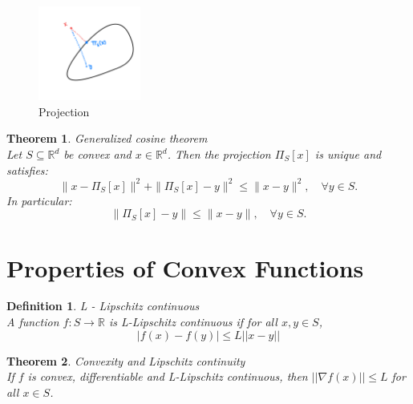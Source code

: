 \documentclass[11pt]{book} %
\newtheorem{theorem}{Theorem}[section]
\newtheorem{definition}{Definition}[section]
\begin{document}
\begin{figure}[H]
    \centering
    \includegraphics[width=0.3\textwidth]{Figs/projection.png}
    \caption{Projection}
\end{figure}


\begin{theorem} {Generalized cosine theorem} \\
    Let \( S \subseteq \mathbb{R}^d \) be convex and \( x \in \mathbb{R}^d \). Then the projection \( \Pi_S[x] \) is unique and satisfies:
    \begin{equation}
    \| x - \Pi_S[x] \|^2 + \| \Pi_S[x] - y \|^2 \leq \| x - y \|^2, \quad \forall y \in S.
    \end{equation}
    In particular:
    \begin{equation}
    \| \Pi_S[x] - y \| \leq \| x - y \|, \quad \forall y \in S.
    \end{equation}
\end{theorem}




\section{Properties of Convex Functions}

\begin{definition}{L - Lipschitz continuous} \\
A function $f: S \rightarrow \mathbb{R}$ is L-Lipschitz continuous if for all $x, y \in S$,
\begin{equation}
    |f(x) - f(y)| \leq L ||x-y||
\end{equation}    
\end{definition}

\begin{theorem}{Convexity and Lipschitz continuity} \\
If $f$ is convex, differentiable and L-Lipschitz continuous, then $||\nabla f(x)|| \leq L$ for all $x \in S$. 
\end{theorem}
\end{document}
